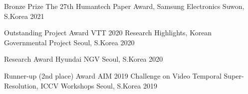 



\begin{cvhonors}

  \cvhonor
    {Bronze Prize} %
    {The 27th Humantech Paper Award, Samsung Electronics} %
    {Suwon, S.Korea} %
    {2021} %

  \cvhonor
    {Outstanding Project Award} %
    {VTT 2020 Research Highlights, Korean Governmental Project} %
    {Seoul, S.Korea} %
    {2020} %

  \cvhonor
    {Research Award} %
    {Hyundai NGV} %
    {Seoul, S.Korea} %
    {2020} %

  \cvhonor
    {Runner-up (2nd place) Award} %
    {AIM 2019 Challenge on Video Temporal Super-Resolution, ICCV Workshops} %
    {Seoul, S.Korea} %
    {2019} %


\end{cvhonors}




